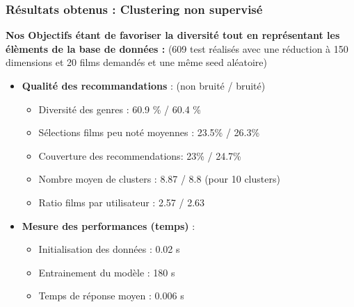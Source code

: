 \documentclass{beamer}
\begin{document}
\begin{frame}
    \frametitle{Résultats obtenus : Clustering non supervisé}
    \scriptsize
    \textbf{Nos Objectifs étant de favoriser la diversité tout en représentant les élèments de la base de données  :}
    (609 test réalisés avec une réduction à 150 dimensions et 20 films demandés et une même seed aléatoire)
    \vspace{0.3cm}
    \begin{itemize}
        \item \textbf{Qualité des recommandations} : (non bruité / bruité)

              \begin{itemize}
                  \item Diversité des genres : 60.9 \% / 60.4 \%
                  \item Sélections films peu noté moyennes : 23.5\% / 26.3\%
                  \item Couverture des recommendations: 23\% / 24.7\%
                  \item Nombre moyen de clusters : 8.87 / 8.8 (pour 10 clusters)
                  \item Ratio films par utilisateur : 2.57 / 2.63
              \end{itemize}
        \item \textbf{Mesure des performances (temps)} :
              \begin{itemize}
                  \item Initialisation des données :  0.02 s
                  \item Entrainement du modèle : 180 s
                  \item Temps de réponse moyen : 0.006 s
              \end{itemize}
    \end{itemize}
\end{frame}

\end{document}
